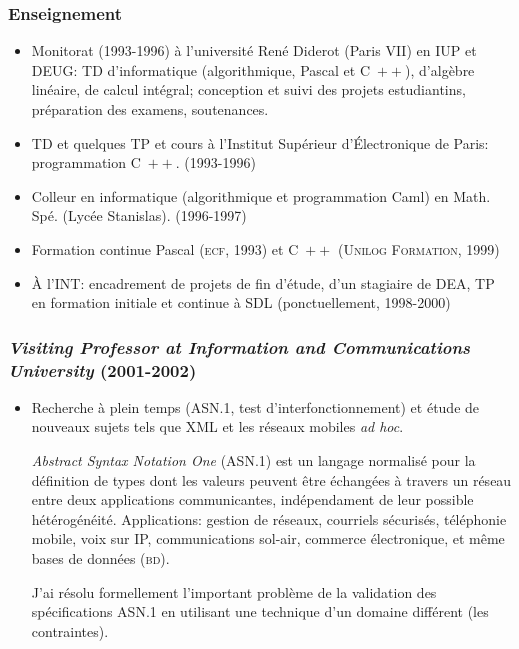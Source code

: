 \documentclass[compress,dvips,xcolor={dvipsnames},t]{beamer}
\newcommand{\cpp}{\mbox{C \hspace*{-2.5mm} \raise 0.7mm\hbox{${\scriptscriptstyle ++}$}}\xspace}
\begin{document}
\begin{frame}
\frametitle{Enseignement}

\begin{itemize}

  \item Monitorat (1993-1996) à l'université René Diderot (Paris VII)
        en IUP et DEUG: TD d'informatique (algorithmique, Pascal et
        \cpp{}), d'algèbre linéaire, de calcul intégral; conception et
        suivi des projets estudiantins, préparation des examens,
        soutenances.

  \item TD et quelques TP et cours à l'Institut Supérieur
        d'Électronique de Paris: programmation \cpp. (1993-1996)

  \item Colleur en informatique (algorithmique et programmation Caml)
        en Math. Spé. (Lycée Stanislas). (1996-1997)

  \item Formation continue Pascal (\textsc{ecf}, 1993) et \cpp{}
        (\textsc{Unilog Formation}, 1999)

  \item À l'INT: encadrement de projets de fin d'étude, d'un stagiaire
        de DEA, TP en formation initiale et continue à SDL
        (ponctuellement, 1998-2000)

\end{itemize}

\end{frame}


\begin{frame}
\frametitle{\emph{Visiting Professor at Information and Communications University} (2001-2002)}

\begin{itemize}

  \item Recherche à plein temps (\mbox{ASN.1}, test
        d'interfonctionnement) et étude de nouveaux sujets tels que
        XML et les réseaux mobiles \emph{ad hoc}.

        \emph{Abstract Syntax Notation One} (\mbox{ASN.1}) est un
	langage normalisé pour la définition de types dont les valeurs
	peuvent être échangées à travers un réseau entre deux
	applications communicantes, indépendament de leur possible
	hétérogénéité. Applications: gestion de réseaux, courriels
	sécurisés, téléphonie mobile, voix sur IP, communications
	sol-air, commerce électronique, et même bases de données
	(\textsc{bd}).

        J'ai résolu formellement l'important problème de la validation
        des spécifications \mbox{ASN.1} en utilisant une technique
        d'un domaine différent (les contraintes).

\end{itemize}

\end{frame}
\end{document}
